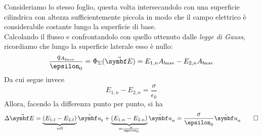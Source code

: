 \begin{demonstration}
\begin{center}
\end{center}
Consideriamo lo stesso foglio, questa volta intersecandolo con una superficie cilindrica con altezza sufficientemente piccola in modo che  il campo elettrico è considerabile costante lungo la superficie di base.\\
Calcolando il flusso e confrontandolo con quello ottenuto dalle \textit{legge di Gauss}, ricordiamo che lungo la superficie laterale esso è nullo:
\begin{equation*}
	\frac{q_{A_{base}}}{\epsilon_0}=\Phi_{\Sigma}(\vba{E})=E_{1,n}A_{base}-E_{2,n}A_{base}
\end{equation*}
Da cui segue invece
\begin{equation*}
	E_{1,n}-E_{2,n}=\frac{\sigma}{\epsilon_0}
\end{equation*}
Allora, facendo la differenza punto per punto, si ha
\begin{equation*}
	\Delta\vba{E}=\underbrace{\left(E_{1,t}-E_{2,t}\right)}_{=0}\vbh{u}_t+\underbrace{\left(E_{1,n}-E_{2,n}\right)}_{=\frac{\sigma}{\epsilon_0}}\vbh{u}_n=\frac{\sigma}{\epsilon_0}\vbh{u}_n\qedhere
\end{equation*}
\end{demonstration}
